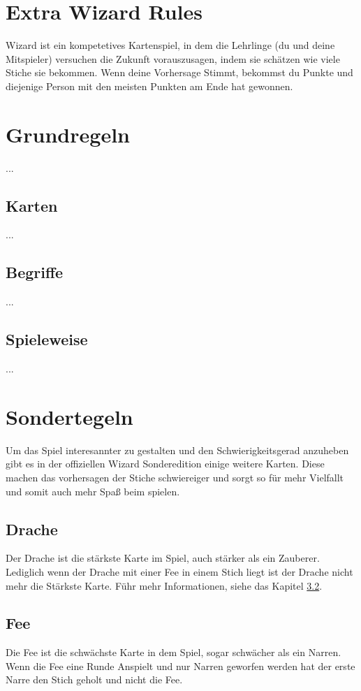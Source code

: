\documentclass[3pt]{article}
\begin{document}
\section{Extra Wizard Rules}
Wizard ist ein kompetetives Kartenspiel, in dem die Lehrlinge (du und deine Mitspieler) versuchen die Zukunft vorauszusagen, indem sie schätzen wie viele Stiche sie bekommen.
Wenn deine Vorhersage Stimmt, bekommst du Punkte und diejenige Person mit den meisten Punkten am Ende hat gewonnen.

\section{Grundregeln}
...

\subsection{Karten}
...

\subsection{Begriffe}
...

\subsection{Spieleweise}
...

\section{Sondertegeln}
Um das Spiel interesannter zu gestalten und den Schwierigkeitsgerad anzuheben gibt es in der offiziellen Wizard Sonderedition einige weitere Karten.
Diese machen das vorhersagen der Stiche schwiereiger und sorgt so für mehr Vielfallt und somit auch mehr Spaß beim spielen.

\subsection{Drache}
Der Drache ist die stärkste Karte im Spiel, auch stärker als ein Zauberer.
Lediglich wenn der Drache mit einer Fee in einem Stich liegt ist der Drache nicht mehr die Stärkste Karte.
Führ mehr Informationen, siehe das Kapitel \ref{cha:fairy}.

\subsection{Fee}\label{cha:fairy}
Die Fee ist die schwächste Karte in dem Spiel, sogar schwächer als ein Narren.
Wenn die Fee eine Runde Anspielt und nur Narren geworfen werden hat der erste Narre den Stich geholt und nicht die Fee.
\end{document}
